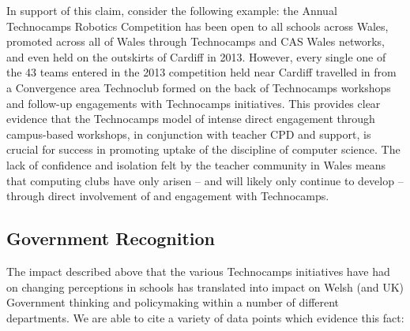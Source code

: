 \documentclass{sig-alternate}
\begin{document}
In support of this claim, consider the following example: the Annual
Technocamps Robotics Competition has been open to all schools across
Wales, promoted across all of Wales through Technocamps and CAS Wales
networks, and even held on the outskirts of Cardiff in 2013.  However,
every single one of the 43 teams entered in the 2013 competition held
near Cardiff travelled in from a Convergence area Technoclub formed on
the back of Technocamps workshops and follow-up engagements with
Technocamps initiatives. This provides clear evidence that the
Technocamps model of intense direct engagement through campus-based
workshops, in conjunction with teacher CPD and support, is crucial for
success in promoting uptake of the discipline of computer science. The
lack of confidence and isolation felt by the teacher community in
Wales means that computing clubs have only arisen -- and will likely
only continue to develop -- through direct involvement of and
engagement with Technocamps.

\subsection{Government Recognition}\label{govrecog}

The impact described above that the various Technocamps initiatives
have had on changing perceptions in schools has translated into impact
on Welsh (and UK) Government thinking and policymaking within a number
of different departments. We are able to cite a variety of data points
which evidence this fact:
\end{document}
